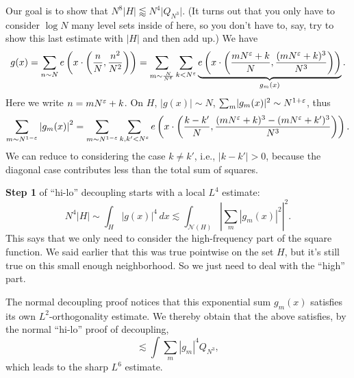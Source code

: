 \documentclass[reqno]{amsart} 
\numberwithin{theorem}{section}
\numberwithin{equation}{section}
\begin{document}
Our goal is to show that $N^8 \lvert H \rvert \lessapprox N^4 \lvert Q_{N^3} \rvert$.
(It turns out that you only have to consider $\log N$ many level sets inside of here, so you don't have to, say, try to show this last estimate with $\lvert H \rvert$ and then add up.)  We have
\begin{equation*}
  g(x) = \sum_{n \sim N} e \left( x \cdot \left( \frac{n}{N}, \frac{n^2}{N^2} \right) \right)
  =
  \sum_{m \sim \frac{N}{N^\varepsilon}}
  \sum_{k < N^\varepsilon}
  \underbrace
  {
    e \left( x \cdot \left( \frac{m N^\varepsilon + k}{N}, \frac{(m N^\varepsilon + k)^3}{N^3} \right) \right)
  }_{
    g_m(x)
  }.
\end{equation*}
Here we write $n = m N^\varepsilon + k$.  On $H$, $\lvert g(x) \rvert \sim N$, $\sum_m \lvert g_m(x) \rvert^2 \sim N^{1 + \varepsilon}$, thus
\begin{equation*}
  \sum_{m \sim N^{1 - \varepsilon}} \left\lvert g_m(x) \right\rvert^2 = \sum_{m \sim N^{1 - \varepsilon}}
  \sum_{k, k' < N^\varepsilon} e \left( x \cdot \left( \frac{k - k '}{N},
      \frac{(m N^\varepsilon  + k)^3 -(m N^\varepsilon + k ')^3}{N^3}\right) \right).
\end{equation*}
We can reduce to considering the case $k \neq k '$, i.e., $\lvert k - k ' \rvert > 0$, because the diagonal case contributes less than the total sum of squares.

\textbf{Step 1} of ``hi-lo'' decoupling starts with a local $L^4$ estimate:
\begin{equation*}
  N^4 \left\lvert H \right\rvert \sim
  \int_{H} \lvert g(x) \rvert^4 \, d x
  \lesssim
  \int_{\mathcal{N}(H)} \left\lvert \sum_m \left\lvert g_m(x) \right\rvert^2  \right\rvert^2.
\end{equation*}
This says that we only need to consider the high-frequency part of the square function.  We said earlier that this was true pointwise on the set $H$, but it's still true on this small enough neighborhood.  So we just need to deal with the ``high'' part.

The normal decoupling proof notices that this exponential sum $g_m(x)$ satisfies its own $L^2$-orthogonality estimate.  We thereby obtain that the above satisfies, by the normal ``hi-lo'' proof of decoupling,
\begin{equation*}
  \lesssim
  \int \sum_m \left\lvert g_m \right\rvert^4 Q_{N^3},
\end{equation*}
which leads to the sharp $L^6$ estimate.
\end{document}
